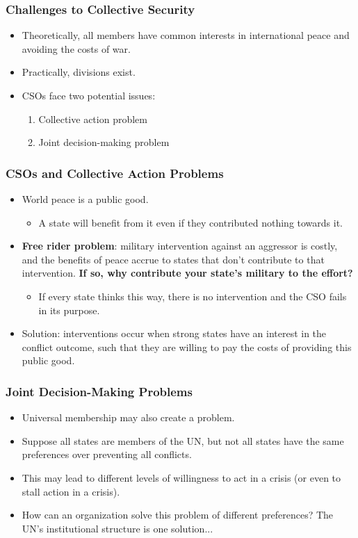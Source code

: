 \documentclass[handout]{beamer}
\begin{document}
\begin{frame} 
	\frametitle{\LARGE{Challenges to Collective Security}}
		\begin{itemize}
			\item Theoretically, all members have common interests in international peace and avoiding the costs of war. \pause
			\item Practically, divisions exist. \pause 
			\item CSOs face two potential issues: \pause
			\begin{enumerate}
				\item Collective action problem
				\item Joint decision-making problem
			\end{enumerate}
		\end{itemize}
\end{frame}

\begin{frame} 
	\frametitle{\LARGE{CSOs and Collective Action Problems}}
	\begin{itemize}
		\item World peace is a public good. \pause
		\begin{itemize}
			\item A state will benefit from it even if they contributed nothing towards it. \pause
		\end{itemize}
	\item \textbf{Free rider problem}: military intervention against an aggressor is costly, and the benefits of peace accrue to states that don't contribute to that intervention. \textbf{If so, why contribute your state's military to the effort?} \pause
		\begin{itemize}
		\item If every state thinks this way, there is no intervention and the CSO fails in its purpose.
		\end{itemize}
	\item Solution: interventions occur when strong states have an interest in the conflict outcome, such that they are willing to pay the costs of providing this public good. 
	\end{itemize}
\end{frame}

\begin{frame} 
	\frametitle{\LARGE{Joint Decision-Making Problems}}
	\begin{itemize}
		\item Universal membership may also create a problem. \pause
		\item Suppose all states are members of the UN, but not all states have the same preferences over preventing all conflicts.	\pause	
		\item This may lead to different levels of willingness to act in a crisis (or even to stall action in a crisis). \pause
		\item How can an organization solve this problem of different preferences? The UN's institutional structure is one solution...
	\end{itemize}
\end{frame}
\end{document}
